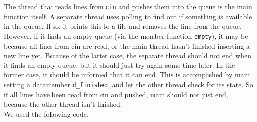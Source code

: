 \documentclass[12pt]{article}
\begin{document}
The thread that reads lines from \texttt{cin} and pushes them into the queue is the main function itself. A separate thread uses polling to find out if something is available in the queue. If so, it prints this to a file and removes the line from the queue. However, if it finds an empty queue (via the member function \texttt{empty}), it may be because all lines from cin are read, or the main thread hasn't finished inserting a new line yet. Because of the latter case, the separate thread should not end when it finds an empty queue, but it should just try again some time later. In the former case, it should be informed that it can end. This is accomplished by main setting a datamember \texttt{d\_finished}, and let the other thread check for its state.   
So if all lines have been read from cin and pushed, main should not just end, because the other thread isn't finished.\\  
We used the following code.
    
    
 

 
 
 
 
 




\clearpage
\end{document}
